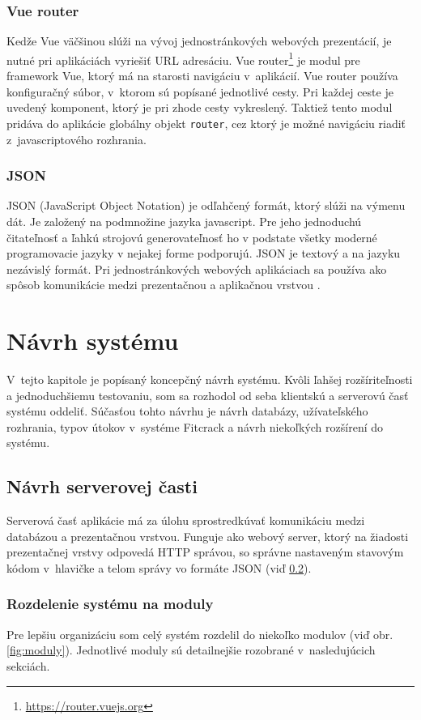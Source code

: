 \documentclass[slovak]{fitthesis}
\begin{document}
\subsection{Vue router}\label{vueRouter}
Kedže Vue väčšinou slúži na vývoj jednostránkových webových prezentácií, je nutné pri aplikáciách vyriešiť URL adresáciu. Vue router\footnote{\url{https://router.vuejs.org}} je modul pre framework Vue, ktorý má na starosti navigáciu v~aplikácií. Vue router používa konfiguračný súbor, v~ktorom sú popísané jednotlivé cesty. Pri každej ceste je uvedený komponent, ktorý je pri zhode cesty vykreslený. Taktiež tento modul pridáva do aplikácie globálny objekt \texttt{router}, cez ktorý je možné navigáciu riadiť z~javascriptového rozhrania.


\subsection{JSON}\label{json}
JSON (JavaScript Object Notation) je odľahčený formát, ktorý slúži na výmenu dát. Je založený na podmnožine jazyka javascript. Pre jeho jednoduchú čitateľnosť a ľahkú strojovú generovateľnosť ho v podstate všetky moderné programovacie jazyky v nejakej forme podporujú. JSON je textový a na jazyku nezávislý formát. Pri jednostránkových webových aplikáciach sa používa ako spôsob komunikácie medzi prezentačnou a aplikačnou vrstvou \cite{JSONrfc}.


\chapter{Návrh systému}\label{navrh}
V~tejto kapitole je popísaný koncepčný návrh systému. Kvôli ľahšej rozšíriteľnosti a jednoduchšiemu testovaniu, som sa rozhodol od seba klientskú a serverovú časť systému oddeliť. Súčasťou tohto návrhu je  návrh databázy, užívateľského rozhrania, typov útokov v~systéme Fitcrack a návrh niekoľkých rozšírení do systému. 

\section{Návrh serverovej časti}\label{navrhServer}
Serverová časť aplikácie má za úlohu sprostredkúvať komunikáciu medzi databázou a prezentačnou vrstvou. Funguje ako webový server, ktorý na žiadosti prezentačnej vrstvy odpovedá HTTP správou, so správne nastaveným stavovým kódom v~hlavičke a telom správy vo formáte JSON (viď \ref{json}).

\subsection{Rozdelenie systému na moduly}
Pre lepšiu organizáciu som celý systém rozdelil do niekoľko modulov (viď obr. \ref{fig:moduly}). Jednotlivé moduly sú detailnejšie rozobrané v~nasledujúcich sekciách. 
\end{document}

